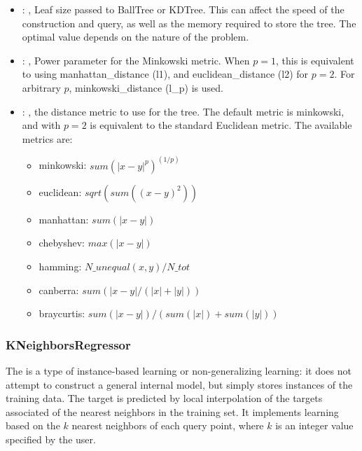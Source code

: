 \begin{itemize}
    \item {}: , 
      Leaf size passed to BallTree or KDTree. This can affect the speed of the construction
      and query, as well as the memory required to store the tree. The optimal value depends on the
      nature of the problem.

    \item {}: , 
      Power parameter for the Minkowski metric. When $p = 1$, this is equivalent to using
      manhattan\_distance (l1), and euclidean\_distance (l2) for $p = 2$. For arbitrary $p$,
      minkowski\_distance                                                  (l\_p) is used.

    \item {}: , 
      the distance metric to use for the tree. The default metric is minkowski, and with
      $p=2$ is equivalent to the standard Euclidean metric.
      The available metrics are:                                                  \begin{itemize}
      \item minkowski: $sum(|x - y|^p)^(1/p)$
      \item euclidean: $sqrt(sum((x - y)^2))$
      \item manhattan: $sum(|x - y|)$                                                    \item
      chebyshev: $max(|x - y|)$                                                    \item hamming:
      $N\_unequal(x, y) / N\_tot$                                                    \item canberra:
      $sum(|x - y| / (|x| + |y|))$                                                    \item
      braycurtis: $sum(|x - y|) / (sum(|x|) + sum(|y|))$
      \end{itemize}
  \end{itemize}


\subsubsection{KNeighborsRegressor}
  The  is a type of instance-based learning or
  non-generalizing learning: it does not attempt to construct a general internal
  model, but simply stores instances of the training data.                          The target is
  predicted by local interpolation of the targets associated                          of the nearest
  neighbors in the training set.                          It implements learning based on the $k$
  nearest neighbors of each query point,                          where $k$ is an integer value
  specified by the user.                          

